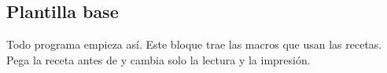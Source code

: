 \subsection{Plantilla base}\label{rec:plantilla}

Todo programa empieza así. Este bloque trae las macros que usan las recetas.
Pega la receta antes de  y cambia solo la lectura y la impresión.



